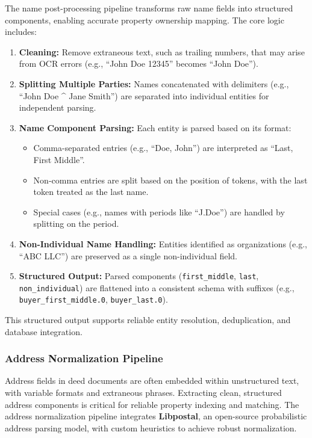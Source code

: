 \documentclass{article}
\begin{document}
The name post-processing pipeline transforms raw name fields into structured components, enabling accurate property ownership mapping. The core logic includes:

\begin{enumerate}
    \item \textbf{Cleaning:} Remove extraneous text, such as trailing numbers, that may arise from OCR errors (e.g., ``John Doe 12345'' becomes ``John Doe'').
    
    \item \textbf{Splitting Multiple Parties:} Names concatenated with delimiters (e.g., ``John Doe \^{} Jane Smith'') are separated into individual entities for independent parsing.
    
    \item \textbf{Name Component Parsing:} Each entity is parsed based on its format:
    \begin{itemize}
        \item Comma-separated entries (e.g., ``Doe, John'') are interpreted as ``Last, First Middle''.
        \item Non-comma entries are split based on the position of tokens, with the last token treated as the last name.
        \item Special cases (e.g., names with periods like ``J.Doe'') are handled by splitting on the period.
    \end{itemize}
    
    \item \textbf{Non-Individual Name Handling:} Entities identified as organizations (e.g., ``ABC LLC'') are preserved as a single non-individual field.
    
    \item \textbf{Structured Output:} Parsed components (\texttt{first\_middle}, \texttt{last}, \texttt{non\_individual}) are flattened into a consistent schema with suffixes (e.g., \texttt{buyer\_first\_middle.0}, \texttt{buyer\_last.0}).
\end{enumerate}

This structured output supports reliable entity resolution, deduplication, and database integration.

\subsubsection{Address Normalization Pipeline}

Address fields in deed documents are often embedded within unstructured text, with variable formats and extraneous phrases. Extracting clean, structured address components is critical for reliable property indexing and matching. The address normalization pipeline integrates \textbf{Libpostal}, an open-source probabilistic address parsing model, with custom heuristics to achieve robust normalization. \\
\end{document}
